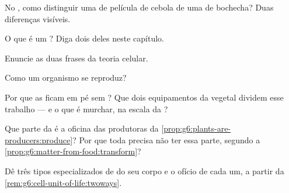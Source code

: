 \begin{exercise}[$\star$]\label{exo:g6:cell-unit-of-life:3}
No , como distinguir uma  de película de cebola de
uma  de bochecha? Duas diferenças visíveis.
\end{exercise}

\begin{exercise}[$\star$]\label{exo:g6:cell-unit-of-life:4}
O que é um  ? Diga dois deles neste capítulo.
\end{exercise}

\begin{exercise}[$\star$]\label{exo:g6:cell-unit-of-life:5}
Enuncie as duas frases da teoria celular.
\end{exercise}

\begin{exercise}[$\star$]\label{exo:g6:cell-unit-of-life:6}
Como um organismo  se reproduz?
\end{exercise}

\begin{exercise}[$\star\star$]\label{exo:g6:cell-unit-of-life:7}
Por que as  ficam em pé sem ? Que dois equipamentos da
 vegetal dividem esse trabalho --- e o que é murchar, na escala
da ?
\end{exercise}

\begin{exercise}[$\star\star$]\label{exo:g6:cell-unit-of-life:8}
Que parte da  é a oficina das produtoras da
\cref{prop:g6:plants-are-producers:produce}? Por que toda 
 precisa não ter essa parte, segundo a
\cref{prop:g6:matter-from-food:transform}?
\end{exercise}

\begin{exercise}[$\star\star$]\label{exo:g6:cell-unit-of-life:9}
Dê três tipos especializados de  do seu corpo e o ofício de cada
um, a partir da \cref{rem:g6:cell-unit-of-life:twoways}.
\end{exercise}

